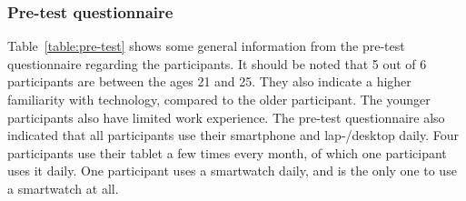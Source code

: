     \subsubsection{Pre-test questionnaire}

    Table~\ref{table:pre-test} shows some general information from the pre-test questionnaire regarding the participants. It should be noted that 5 out of 6 participants are between the ages 21 and 25. They also indicate a higher familiarity with technology, compared to the older participant. The younger participants also have limited work experience. The pre-test questionnaire also indicated that all participants use their smartphone and lap-/desktop daily. Four participants use their tablet a few times every month, of which one participant uses it daily. One participant uses a smartwatch daily, and is the only one to use a smartwatch at all.
    
    \begin{table}[!t]
        \caption{Pre-test results: general participant information}\label{table:pre-test}
    \end{table}


